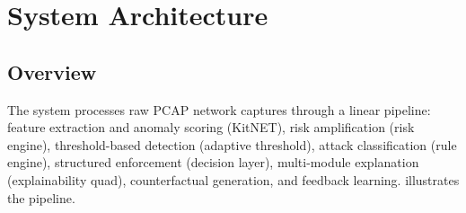 \documentclass[preprint,12pt,authoryear]{elsarticle}
\begin{document}
\section{System Architecture}
\label{sec:architecture}

\subsection{Overview}
\label{subsec:overview}

The system processes raw PCAP network captures through a linear pipeline:
feature extraction and anomaly scoring (KitNET), risk amplification (risk
engine), threshold-based detection (adaptive threshold), attack classification
(rule engine), structured enforcement (decision layer), multi-module explanation
(explainability quad), counterfactual generation, and feedback learning.
 illustrates the pipeline.
\end{document}
